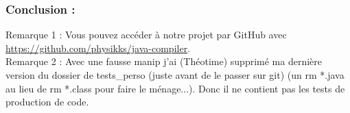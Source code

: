 \documentclass[12pt,a4paper]{report}
\begin{document}
\subsubsection*{Conclusion :}
\noindent Remarque 1 : Vous pouvez accéder à notre projet par GitHub avec \url{https://github.com/physikks/java-compiler}. \\
Remarque 2 : Avec une fausse manip j'ai (Théotime) supprimé ma dernière version du dossier de tests\_perso (juste avant de le passer sur git) (un rm *.java au lieu de rm *.class pour faire le ménage...). Donc il ne contient pas les tests de production de code.
\end{document}

